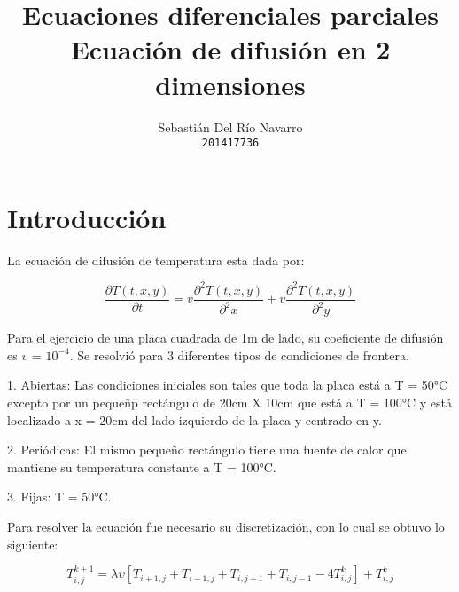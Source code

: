 \documentclass[twoside]{article}
\title{\vspace{-15mm}\fontsize{20pt}{12pt}\selectfont\textbf{ Ecuaciones diferenciales parciales \\ Ecuación de difusión en 2 dimensiones \\ }}
\author{
  Sebastián Del Río Navarro\\
  \texttt{201417736}\\
  }
\begin{document}
\maketitle %
\thispagestyle{fancy} %





\section{Introducción}

La ecuación de difusión de temperatura esta dada por: 

\begin{equation}
    \frac{\partial T(t,x,y)}{\partial t} = v \frac{\partial ^2 T(t,x,y)}{\partial ^2 x} + v \frac{\partial ^2 T(t,x,y)}{\partial ^2 y}
\end{equation}

Para el ejercicio de una placa cuadrada de 1m de lado, su coeficiente de difusión es $v$ = $10 ^{-4}$. Se resolvió para 3 diferentes tipos de condiciones de frontera. 

1. Abiertas: Las condiciones iniciales son tales que toda la placa está a T = 50°C excepto por un pequeñp rectángulo de 20cm X 10cm que está a T = 100°C y está localizado a x = 20cm del lado izquierdo de la placa y centrado en y. 

2. Periódicas: El mismo pequeño rectángulo tiene una fuente de calor que mantiene su temperatura constante a T = 100°C. 

3. Fijas: T = 50°C. 

Para resolver la ecuación fue necesario su discretización, con lo cual se obtuvo lo siguiente: 

\begin{equation}
    T_{i,j}^{k+1}  = \lambda \upsilon [T_{i+1,j} + T_{i-1,j} + T_{i,j+1} + T_{i,j-1} - 4 T_{i,j}^{k}] + T_{i,j}^{k} 
\end{equation}




\end{document}

